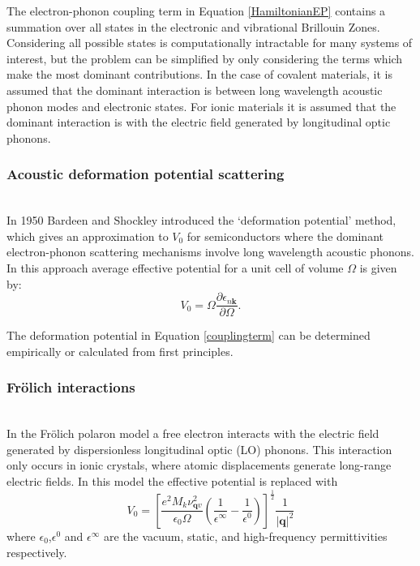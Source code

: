The electron-phonon coupling term in Equation \ref{HamiltonianEP} contains a summation over all states in the electronic and vibrational Brillouin Zones. Considering all possible states is computationally intractable for many systems of interest, but the problem can be simplified by only considering the terms which make the most dominant contributions. In the case of covalent materials, it is assumed that the dominant interaction is between long wavelength acoustic phonon modes and electronic states. For ionic materials it is assumed that the dominant interaction is with the electric field generated by longitudinal optic phonons.

\subsubsection{Acoustic deformation potential scattering}\\
 In 1950 Bardeen and Shockley introduced the `deformation potential' method,\autocite{Bardeen1950} which gives an approximation to $V_0$ for semiconductors where the dominant electron-phonon scattering mechanisms involve long wavelength acoustic phonons.\autocite{Giustino2017} In this approach average effective potential for a unit cell of volume $\Omega$ is given by:
\begin{equation} \label{couplingterm} 
   V_0 = \Omega\frac{\partial\epsilon_{n\textbf{k}}}{\partial\Omega}.
\end{equation}

The deformation potential in Equation \ref{couplingterm} can be determined empirically or calculated from first principles. 

\subsubsection{Fr\"{o}lich interactions}\\
In the Fr\"{o}lich polaron model a free electron interacts with the electric field generated by dispersionless longitudinal optic (LO) phonons.
This interaction only occurs in ionic crystals, where atomic displacements generate long-range electric fields.
In this model the effective potential is replaced with
\begin{equation}
    V_0 = \left[\frac{e^2M_k\nu^2_{\textbf{q}v}}{\epsilon_0\Omega}\left(\frac{1}{\epsilon^{\infty}}-\frac{1}{\epsilon^0}\right)\right]^{\frac{1}{2}}\frac{1}{|\textbf{q}|^2}
\end{equation}
where $\epsilon_0$,$\epsilon^0$ and $\epsilon^{\infty}$ are the vacuum, static, and high-frequency permittivities respectively.

